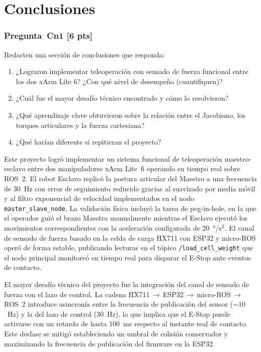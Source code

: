 \documentclass[journal,10pt,twoside]{IEEEtran}
\newcommand{\pts}[1]{\textbf{\color{tec_red}[#1 pts]}}
\begin{document}
\section{Conclusiones}
\label{sec:conclusions}

\subsubsection*{Pregunta~Cn1 \pts{6}}
Redacten una sección de conclusiones que responda:
\begin{enumerate}[label=(\alph*)]
  \item ¿Lograron implementar teleoperación con sensado de fuerza
        funcional entre los dos xArm Lite 6? ¿Con qué nivel de
        desempeño (cuantifiquen)?
  \item ¿Cuál fue el mayor desafío técnico encontrado y cómo lo resolvieron?
  \item ¿Qué aprendizaje clave obtuvieron sobre la relación entre
        el Jacobiano, los torques articulares y la fuerza cartesiana?
  \item ¿Qué harían diferente si repitieran el proyecto?
\end{enumerate}

Este proyecto logró implementar un sistema funcional de
teleoperación maestro-esclavo entre dos manipuladores xArm
Lite~6 operando en tiempo real sobre ROS~2. El robot Esclavo
replicó la postura articular del Maestro a una frecuencia de
30~Hz con error de seguimiento reducido gracias al suavizado por
media móvil y al filtro exponencial de velocidad implementados en
el nodo \texttt{master\_slave\_node}. La validación física incluyó
la tarea de peg-in-hole, en la que el operador guió el brazo
Maestro manualmente mientras el Esclavo ejecutó los movimientos
correspondientes con la aceleración configurada de 20~°/s$^2$.
El canal de sensado de fuerza basado en la celda de carga HX711
con ESP32 y micro-ROS operó de forma estable, publicando lecturas
en el tópico \texttt{/load\_cell\_weight} que el nodo principal
monitoreó en tiempo real para disparar el E-Stop ante eventos de
contacto.

El mayor desafío técnico del proyecto fue la integración del canal
de sensado de fuerza con el lazo de control. La cadena
HX711\,$\rightarrow$\,ESP32\,$\rightarrow$\,micro-ROS\,$\rightarrow$\,ROS~2
introduce asincronía entre la frecuencia de publicación del sensor
(${\sim}10$~Hz) y la del lazo de control (30~Hz), lo que implica
que el E-Stop puede activarse con un retardo de hasta 100~ms
respecto al instante real de contacto. Este desfase se mitigó
estableciendo un umbral de colisión conservador y maximizando la
frecuencia de publicación del firmware en la ESP32.
\end{document}
